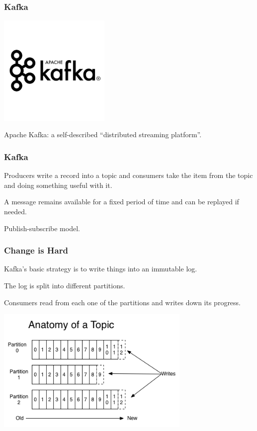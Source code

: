 \begin{frame}
\frametitle{Kafka}

\begin{center}
	\includegraphics[width=0.4\textwidth]{images/kafkalogo.png}
\end{center}


Apache Kafka: a self-described ``distributed streaming platform''.

\end{frame}


\begin{frame}
\frametitle{Kafka}

Producers write a record into a topic and consumers take the item from the topic and doing something useful with it.

A message remains available for a fixed period of time and can be replayed if needed.

Publish-subscribe model.

\end{frame}



\begin{frame}
\frametitle{Change is Hard}

Kafka's basic strategy is to write things into an immutable log. 

The log is split into different partitions.

Consumers read from each one of the partitions and writes down its progress.

\begin{center}
	\includegraphics[width=0.7\textwidth]{images/kafka-partition.png}
\end{center}


\end{frame}


